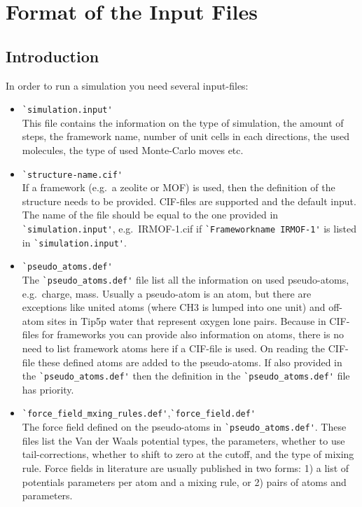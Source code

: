 \chapter{Format of the Input Files}

\section{Introduction}

In order to run a simulation you need several input-files:
\begin{itemize}
\item{\verb=`simulation.input'=}\\
This file contains the information on the type of simulation, the amount of steps, the framework name, number of unit cells
in each directions, the used molecules, the type of used Monte-Carlo moves etc.\
\item{\verb=`structure-name.cif'=}\\
If a framework (e.g.\ a zeolite or MOF) is used, then the definition of the structure needs to be provided. CIF-files are supported and the default input.
The name of the file should be equal to the one provided in \verb=`simulation.input'=, e.g.\ IRMOF-1.cif if \verb=`Frameworkname IRMOF-1'= is listed in
\verb=`simulation.input'=.
\item{\verb=`pseudo_atoms.def'=}\\
The \verb=`pseudo_atoms.def'= file list all the information on used pseudo-atoms, e.g.\ charge, mass. Usually a pseudo-atom is an atom, but there are exceptions
like united atoms (where CH3 is lumped into one unit) and off-atom sites in Tip5p water that represent oxygen lone pairs.
Because in CIF-files for frameworks you can provide also
information on atoms, there is no need to list framework atoms here if a CIF-file is used. On reading the CIF-file these defined atoms are added to the
pseudo-atoms. If also provided in the \verb=`pseudo_atoms.def'= then the definition in the \verb=`pseudo_atoms.def'= file has priority.
\item{\verb=`force_field_mxing_rules.def'=,\verb=`force_field.def'=}\\
The force field defined on the pseudo-atoms in \verb=`pseudo_atoms.def'=. These files list the Van der Waals potential types, the parameters, whether to
use tail-corrections, whether to shift to zero at the cutoff, and the type of mixing rule.
Force fields in literature are usually published in two forms: 1) a list of potentials parameters per atom and a mixing rule, or 2) pairs of atoms and parameters.

\end{itemize}
